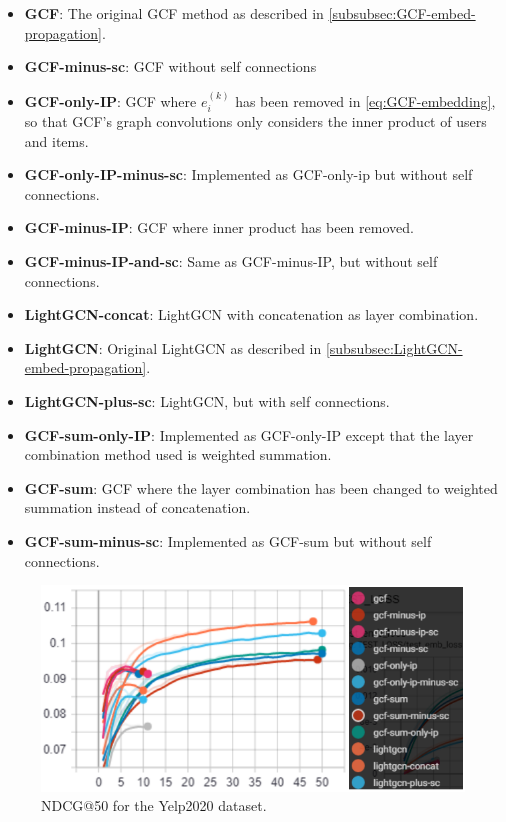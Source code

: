 \begin{itemize}
    \item \textbf{GCF}: The original GCF method as described in \autoref{subsubsec:GCF-embed-propagation}.
    \item \textbf{GCF-minus-sc}: GCF without self connections
    \item \textbf{GCF-only-IP}:  GCF where $e_i^{(k)}$ has been removed in \autoref{eq:GCF-embedding}, so that GCF's graph convolutions only considers the inner product of users and items.
    \item \textbf{GCF-only-IP-minus-sc}: Implemented as GCF-only-ip but without self connections.
    \item \textbf{GCF-minus-IP}: GCF where inner product has been removed.
    \item \textbf{GCF-minus-IP-and-sc}: Same as GCF-minus-IP, but without self connections.
    \item \textbf{LightGCN-concat}: LightGCN with concatenation as layer combination.
    \item \textbf{LightGCN}: Original LightGCN as described in \autoref{subsubsec:LightGCN-embed-propagation}.
    \item \textbf{LightGCN-plus-sc}: LightGCN, but with self connections.
    \item \textbf{GCF-sum-only-IP}: Implemented as GCF-only-IP except that the layer combination method used is weighted summation.
    \item \textbf{GCF-sum}: GCF where the layer combination has been changed to weighted summation instead of concatenation.
    \item \textbf{GCF-sum-minus-sc}: Implemented as GCF-sum but without self connections.
\end{itemize}
\begin{figure}[h!]
    \includegraphics[width=\linewidth]{figures/gcf-all-ndcg.png}
    \caption{NDCG@50 for the Yelp2020 dataset.}
    \label{fig:GCF-NDCG-ablation-study}
\end{figure}
